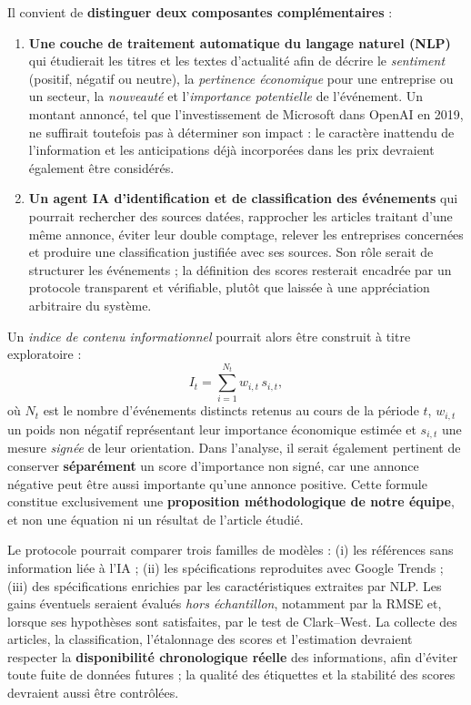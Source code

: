 \documentclass[11pt,a4paper]{article}
\begin{document}
Il convient de \textbf{distinguer deux composantes complémentaires} :
\begin{enumerate}
\item \textbf{Une couche de traitement automatique du langage naturel (NLP)} qui étudierait les titres et les textes d'actualité afin de décrire le \emph{sentiment} (positif, négatif ou neutre), la \emph{pertinence économique} pour une entreprise ou un secteur, la \emph{nouveauté} et l'\emph{importance potentielle} de l'événement. Un montant annoncé, tel que l'investissement de Microsoft dans OpenAI en 2019, ne suffirait toutefois pas à déterminer son impact : le caractère inattendu de l'information et les anticipations déjà incorporées dans les prix devraient également être considérés.
\item \textbf{Un agent IA d'identification et de classification des événements} qui pourrait rechercher des sources datées, rapprocher les articles traitant d'une même annonce, éviter leur double comptage, relever les entreprises concernées et produire une classification justifiée avec ses sources. Son rôle serait de structurer les événements ; la définition des scores resterait encadrée par un protocole transparent et vérifiable, plutôt que laissée à une appréciation arbitraire du système.
\end{enumerate}

Un \emph{indice de contenu informationnel} pourrait alors être construit à titre exploratoire :
\begin{equation}
\label{eq:extension}
I_t=\sum_{i=1}^{N_t} w_{i,t}\,s_{i,t},
\end{equation}
où $N_t$ est le nombre d'événements distincts retenus au cours de la période $t$, $w_{i,t}$ un poids non négatif représentant leur importance économique estimée et $s_{i,t}$ une mesure \emph{signée} de leur orientation. Dans l'analyse, il serait également pertinent de conserver \textbf{séparément} un score d'importance non signé, car une annonce négative peut être aussi importante qu'une annonce positive. Cette formule constitue exclusivement une \textbf{proposition méthodologique de notre équipe}, et non une équation ni un résultat de l'article étudié.

Le protocole pourrait comparer trois familles de modèles : (i) les références sans information liée à l'IA ; (ii) les spécifications reproduites avec Google Trends ; (iii) des spécifications enrichies par les caractéristiques extraites par NLP. Les gains éventuels seraient évalués \emph{hors échantillon}, notamment par la RMSE et, lorsque ses hypothèses sont satisfaites, par le test de Clark--West. La collecte des articles, la classification, l'étalonnage des scores et l'estimation devraient respecter la \textbf{disponibilité chronologique réelle} des informations, afin d'éviter toute fuite de données futures ; la qualité des étiquettes et la stabilité des scores devraient aussi être contrôlées.
\end{document}
